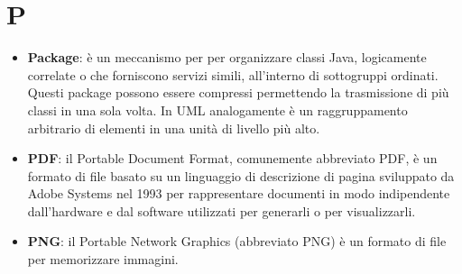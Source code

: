 \section{P}
\begin{itemize} 
	\item
	\textbf{Package}: è un meccanismo per per organizzare classi Java, logicamente correlate o che forniscono servizi simili, all’interno di sottogruppi ordinati. Questi package possono essere compressi permettendo la trasmissione di più classi in una sola volta.
	In UML analogamente è un raggruppamento arbitrario di elementi in una unità di livello più alto.
	\item
	\textbf{PDF}: il Portable Document Format, comunemente abbreviato PDF, è un formato di file basato su un linguaggio di descrizione di pagina sviluppato da Adobe Systems nel 1993 per rappresentare documenti in modo indipendente dall’hardware e dal software utilizzati per generarli o per visualizzarli.
	\item
	\textbf{PNG}: il Portable Network Graphics (abbreviato PNG) è un formato di file per memorizzare immagini.
\end{itemize}

